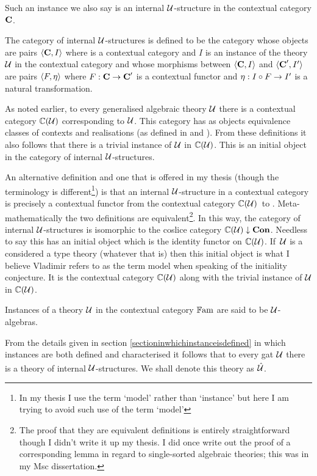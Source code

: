 {\note
Such an instance we also say is an internal $\gat[U]$-structure in the contextual category $\catc$. 

\note
The category of internal $\gat[U]$-structures is defined to be the category whose objects
are pairs $\tuple{\catc,I}$ where \catcw is a contextual category and $I$ is an instance of the theory $\gat[U]$ in the contextual category \catcw and whose morphisms between $\tuple{\catc,I}$ and $\tuple{\catc',I'}$ are pairs $\tuple{F, \eta}$ where
$F: \catc \morph \catc'$ is a contextual functor and $\eta: I \circ F \morph  I'$ is a natural transformation. 

\note 
As  noted earlier, to every generalised algebraic theory $\gat[U]$ there  is a contextual category $\CofU$ corresponding to $\gat[U]$. This category has as objects equivalence classes of contexts and realisations (as defined 
in \cite{Cartmell78} and  \cite{Cartmell86}). 
From these definitions it also follows that there is a trivial instance
of $\gat[U]$ in  $\CofU$. This is an initial object in
the category of internal $\gat[U]$-structures.

\note 
An alternative definition and one that is offered  in my thesis 
(though the terminology is different\footnote{In my thesis I use the term `model' rather than `instance'  but here I am trying to avoid such use of the term `model'}) is that an internal $\gat[U]$-structure in a contextual category \catcw is precisely 
a contextual functor from the contextual category $\CofU$\  to \catc. 
Meta-mathematically the two definitions are equivalent\footnote{The proof that they are equivalent 
definitions is entirely straightforward though I didn't write it up my thesis. I did once write out the proof of a  corresponding lemma in regard to single-sorted algebraic theories; this was in my Msc dissertation.}.
\note
In this way, the category of internal $\gat[U]$-structures  is isomorphic to the coslice category
$\CofU \downarrow \catCon$. Needless to say this has an initial object which is the identity functor on  $\CofU$.
If\ $\gat[U]$ is a considered a type theory (whatever that is) then this initial object is what I believe Vladimir refers
to as the term model when speaking of the initiality conjecture. It is the contextual category
$\CofU$ along with the trivial instance of $\gat[U]$ in $\CofU$.

\note 
Instances of a theory $\gat[U]$ in the contextual category $\Fam$ are said to be $\gat[U]$-algebras. 

\note 
From the details given in
section \ref{sectioninwhichinstanceisdefined} 
in which instances are both defined and characterised 
it follows that 
to every gat $\gat[U]$ there is a theory of internal $\gat[U]$-structures. We shall denote this theory as $\hatU$.

}
